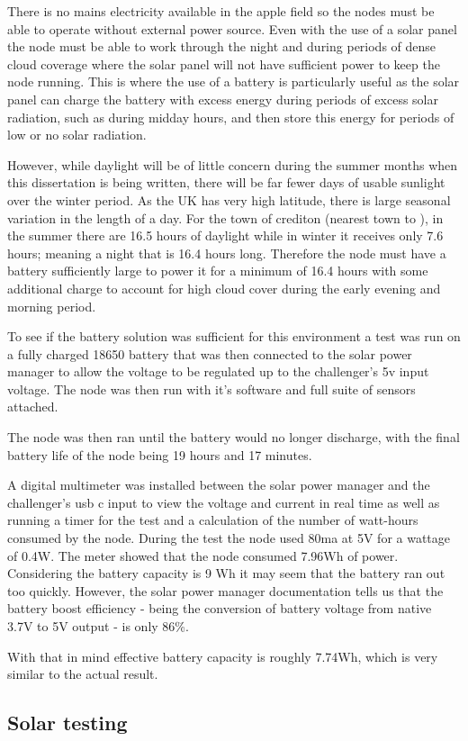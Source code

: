There is no mains electricity available in the apple field so the nodes must be
able to operate without external power source. Even with the use of a solar
panel the node must be able to work through the night and during periods of
dense cloud coverage where the solar panel will not have sufficient power to
keep the node running. This is where the use of a battery is particularly useful
as the solar panel can charge the battery with excess energy during periods of
excess solar radiation, such as during midday hours, and then store this energy
for periods of low or no solar radiation.

However, while daylight will be of little concern during the summer months when
this dissertation is being written, there will be far fewer days of usable
sunlight over the winter period. As the UK has very high latitude, there is
large seasonal variation in the length of a day. For the town of crediton
(nearest town to \farmName), in the summer there are 16.5 hours of daylight
while in winter it receives only 7.6 hours; meaning a night that is 16.4 hours
long. Therefore the node must have a battery sufficiently large to power it for
a minimum of 16.4 hours with some additional charge to account for high cloud
cover during the early evening and morning period.

To see if the battery solution was sufficient for this environment a test
was run on a fully charged 18650 battery that was then connected to the solar
power manager to allow the voltage to be regulated up to the challenger's 5v
input voltage. The node was then run with it's software and full suite of
sensors attached.

The node was then ran until the battery would no longer discharge, with the
final battery life of the node being 19 hours and 17 minutes.

A digital multimeter was installed between the solar power manager and the
challenger's usb c input to view the voltage and current in real time as well as
running a timer for the test and a calculation of the number of watt-hours
consumed by the node. During the test the node used 80ma at 5V for a wattage of
0.4W. The meter showed that the node consumed 7.96Wh of power. Considering the
battery capacity is 9 Wh it may seem that the battery ran out too quickly.
However, the solar power manager documentation tells us that the battery boost
efficiency - being the conversion of battery voltage from native 3.7V to 5V
output - is only 86\%.

With that in mind effective battery capacity is roughly 7.74Wh, which is very
similar to the actual result.

\subsection{Solar testing}

